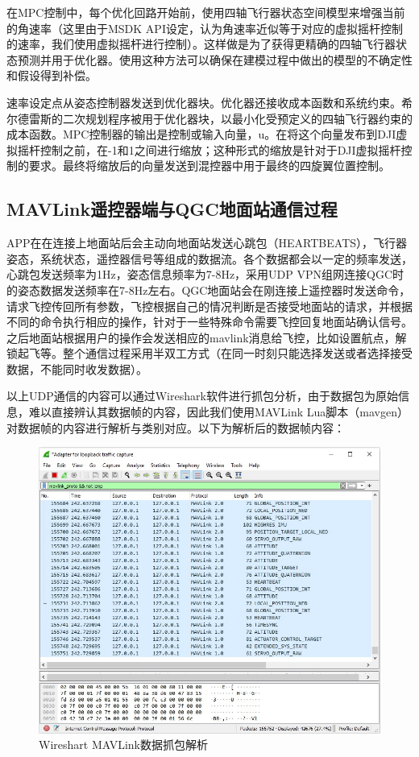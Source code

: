 在MPC控制中，每个优化回路开始前，使用四轴飞行器状态空间模型来增强当前的角速率（这里由于MSDK API设定，认为角速率近似等于对应的虚拟摇杆控制的速率，我们使用虚拟摇杆进行控制）。这样做是为了获得更精确的四轴飞行器状态预测并用于优化器。使用这种方法可以确保在建模过程中做出的模型的不确定性和假设得到补偿。

速率设定点从姿态控制器发送到优化器块。优化器还接收成本函数和系统约束。希尔德雷斯的二次规划程序被用于优化器块，以最小化受预定义的四轴飞行器约束的成本函数。MPC控制器的输出是控制或输入向量，u。在将这个向量发布到DJI虚拟摇杆控制之前，在-1和1之间进行缩放；这种形式的缩放是针对于DJI虚拟摇杆控制的要求。最终将缩放后的向量发送到混控器中用于最终的四旋翼位置控制。

\subsection{MAVLink遥控器端与QGC地面站通信过程}

APP在在连接上地面站后会主动向地面站发送心跳包（HEARTBEATS），飞行器姿态，系统状态，遥控器信号等组成的数据流。各个数据都会以一定的频率发送，心跳包发送频率为1Hz，姿态信息频率为7-8Hz，采用UDP VPN组网连接QGC时的姿态数据发送频率在7-8Hz左右。QGC地面站会在刚连接上遥控器时发送命令，请求飞控传回所有参数，飞控根据自己的情况判断是否接受地面站的请求，并根据不同的命令执行相应的操作，针对于一些特殊命令需要飞控回复地面站确认信号。之后地面站根据用户的操作会发送相应的mavlink消息给飞控，比如设置航点，解锁起飞等。整个通信过程采用半双工方式（在同一时刻只能选择发送或者选择接受数据，不能同时收发数据）。

以上UDP通信的内容可以通过Wireshark软件进行抓包分析，由于数据包为原始信息，难以直接辨认其数据帧的内容，因此我们使用MAVLink Lua脚本（mavgen）对数据帧的内容进行解析与类别对应。以下为解析后的数据帧内容：

\begin{figure}[ht]
  \centering
  \includegraphics[width=0.8\linewidth]{./Figure/Mavlink_Wireshark_Decode.jpg}
  \caption{Wireshart MAVLink数据抓包解析}\label{Fig:xd1}
\end{figure}

